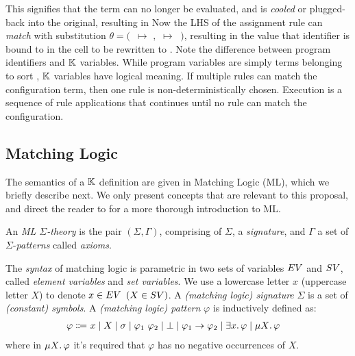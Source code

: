This signifies that the term can no longer be evaluated, and is \emph{cooled}
or plugged-back into the original, resulting in 
Now the LHS of the assignment rule can \emph{match} with substitution $\theta =
($\ $ \mapsto $ $,$  $\mapsto\ $ $)$, resulting in the value that identifier 
is bound to in the  cell to be rewritten to .
Note the difference between program identifiers and $\mathbb{K}$ variables. While
program variables are simply terms belonging to sort ,
$\mathbb{K}$ variables have logical meaning. If multiple rules can match
the configuration term, then one rule is non-deterministically chosen.
Execution is a sequence of rule applications that continues until no
rule can match the configuration.

\subsection{Matching Logic}

The semantics of a $\mathbb{K}$ definition are given in
Matching Logic (ML), which we briefly
describe next. We only present concepts that are
relevant to this proposal, and direct the reader to \cite{RosuLMCS17,ChenLICS19}
for a more thorough introduction to ML.

An \emph{ML $\Sigma$-theory} is the pair $\left(\Sigma, \Gamma\right)$,
comprising of $\Sigma$, a \emph{signature}, and $\Gamma$ a set of
$\Sigma$-\emph{patterns} called \emph{axioms}.

The \emph{syntax} of matching logic is parametric in two sets of variables
$EV$ and $SV$,
called \emph{element variables} and \emph{set variables}. We use
a lowercase letter $x$ (uppercase letter $X$) to denote $x \in EV$ $(X \in SV)$.
A \emph{(matching logic) signature} $\Sigma$ is a set of \emph{(constant)
  symbols}. A \emph{(matching logic) pattern} $\varphi$ is inductively defined as:
\begin{align*}
\varphi \Coloneqq\
& x
\mid X
\mid \sigma
\mid \varphi_1 \  \varphi_2
\mid \bot
\mid \varphi_1 \imp \varphi_2
\mid \exists x \ld \varphi
\mid \mu X \ld \varphi %
\end{align*}
where in $\mu X \mathord{.\,} \varphi$ it's required that $\varphi$ has no negative occurrences of $X$.


